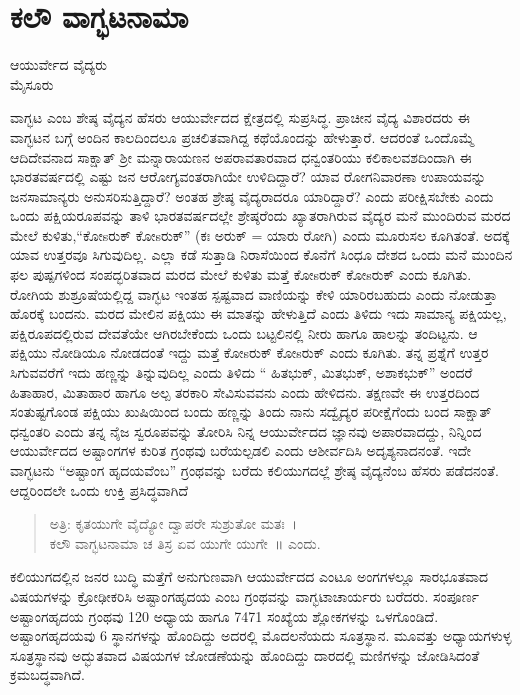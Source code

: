 {\fontsize{14}{16}\selectfont
\chapter{ಕಲೌ ವಾಗ್ಭಟನಾಮಾ} 

\begin{center}
\smallskip

ಆಯುರ್ವೇದ ವೈದ್ಯರು\\
ಮೈಸೂರು
\addrule
\end{center}

ವಾಗ್ಭಟ ಎಂಬ ಶೇಷ್ಠ ವೈದ್ಯನ ಹೆಸರು ಆಯುರ್ವೇದದ ಕ್ಷೇತ್ರದಲ್ಲಿ ಸುಪ್ರಸಿದ್ಧ. ಪ್ರಾಚೀನ ವೈದ್ಯ ವಿಶಾರದರು ಈ ವಾಗ್ಭಟನ ಬಗ್ಗೆ ಅಂದಿನ ಕಾಲದಿಂದಲೂ ಪ್ರಚಲಿತವಾಗಿದ್ದ ಕಥೆಯೊಂದನ್ನು ಹೇಳುತ್ತಾರೆ. ಆದರಂತೆ ಒಂದೊಮ್ಮೆ ಆದಿದೇವನಾದ  ಸಾಕ್ಷಾತ್ ಶ್ರೀ ಮನ್ನಾರಾಯಣನ ಅಪರಾವತಾರವಾದ ಧನ್ವಂತರಿಯು ಕಲಿಕಾಲವಶದಿಂದಾಗಿ ಈ ಭಾರತವರ್ಷದಲ್ಲಿ ಎಷ್ಟು ಜನ ಆರೋಗ್ಯವಂತರಾಗಿಯೇ ಉಳಿದಿದ್ದಾರೆ? ಯಾವ ರೋಗನಿವಾರಣಾ ಉಪಾಯವನ್ನು ಜನಸಾಮಾನ್ಯರು ಅನುಸರಿಸುತ್ತಿದ್ದಾರೆ? ಅಂತಹ ಶ್ರೇಷ್ಠ ವೈದ್ಯರಾದರೂ ಯಾರಿದ್ದಾರೆ? ಎಂದು ಪರೀಕ್ಷಿಸಬೇಕು ಎಂದು ಒಂದು ಪಕ್ಷಿಯರೂಪವನ್ನು ತಾಳಿ ಭಾರತವರ್ಷದಲ್ಲೇ ಶ್ರೇಷ್ಠರೆಂದು ಖ್ಯಾತರಾಗಿರುವ ವೈದ್ಯರ ಮನೆ ಮುಂದಿರುವ ಮರದ ಮೇಲೆ ಕುಳಿತು,“ಕೋsರುಕ್ ಕೋsರುಕ್” (ಕಃ ಅರುಕ್ = ಯಾರು ರೋಗಿ) ಎಂದು ಮೂರುಸಲ ಕೂಗಿತಂತೆ. ಅದಕ್ಕೆ ಯಾವ ಉತ್ತರವೂ ಸಿಗುವುದಿಲ್ಲ. ಎಲ್ಲಾ ಕಡೆ ಸುತ್ತಾಡಿ ನಿರಾಸೆಯಿಂದ ಕೊನೆಗೆ ಸಿಂಧೂ ದೇಶದ ಒಂದು ಮನೆ ಮುಂದಿನ ಫಲ ಪುಷ್ಪಗಳಿಂದ ಸಂಪದ್ಭರಿತವಾದ ಮರದ ಮೇಲೆ ಕುಳಿತು ಮತ್ತೆ ಕೋsರುಕ್ ಕೋsರುಕ್ ಎಂದು ಕೂಗಿತು. ರೋಗಿಯ ಶುಶ್ರೂಷೆಯಲ್ಲಿದ್ದ ವಾಗ್ಭಟ ಇಂತಹ ಸ್ಪಷ್ಟವಾದ ವಾಣಿಯನ್ನು ಕೇಳಿ ಯಾರಿರಬಹುದು ಎಂದು ನೋಡುತ್ತಾ ಹೊರಕ್ಕೆ ಬಂದನು. ಮರದ ಮೇಲಿನ ಪಕ್ಷಿಯು ಈ ಮಾತನ್ನು ಹೇಳುತ್ತಿದೆ ಎಂದು ತಿಳಿದು ಇದು ಸಾಮಾನ್ಯ ಪಕ್ಷಿಯಲ್ಲ, ಪಕ್ಷಿರೂಪದಲ್ಲಿರುವ ದೇವತೆಯೇ ಆಗಿರಬೇಕೆಂದು ಒಂದು ಬಟ್ಟಲಿನಲ್ಲಿ ನೀರು ಹಾಗೂ ಹಾಲನ್ನು ತಂದಿಟ್ಟನು. ಆ ಪಕ್ಷಿಯು ನೋಡಿಯೂ ನೋಡದಂತೆ ಇದ್ದು ಮತ್ತೆ ಕೋsರುಕ್ ಕೋsರುಕ್ ಎಂದು ಕೂಗಿತು. ತನ್ನ ಪ್ರಶ್ನೆಗೆ ಉತ್ತರ ಸಿಗುವವರೆಗೆ ಇದು ಹಣ್ಣನ್ನು ತಿನ್ನುವುದಿಲ್ಲ ಎಂದು ತಿಳಿದು “ ಹಿತಭುಕ್, ಮಿತಭುಕ್, ಅಶಾಕಭುಕ್” ಅಂದರೆ ಹಿತಾಹಾರ, ಮಿತಾಹಾರ ಹಾಗೂ ಅಲ್ಪ ತರಕಾರಿ ಸೇವಿಸುವವನು ಎಂದು ಹೇಳಿದನು. ತಕ್ಷಣವೇ ಈ ಉತ್ತರದಿಂದ ಸಂತುಷ್ಟಗೊಂಡ ಪಕ್ಷಿಯು ಖುಷಿಯಿಂದ ಬಂದು ಹಣ್ಣನ್ನು ತಿಂದು ನಾನು ಸದ್ವೈದ್ಯರ ಪರೀಕ್ಷೆಗೆಂದು ಬಂದ ಸಾಕ್ಷಾತ್ ಧನ್ವಂತರಿ ಎಂದು ತನ್ನ ನೈಜ ಸ್ವರೂಪವನ್ನು ತೋರಿಸಿ ನಿನ್ನ ಆಯುರ್ವೇದದ ಜ್ಞಾನವು ಅಪಾರವಾದದ್ದು, ನಿನ್ನಿಂದ ಆಯುರ್ವೇದದ ಅಷ್ಟಾಂಗಗಳ ಕುರಿತ ಗ್ರಂಥವು ಬರೆಯಲ್ಪಡಲಿ ಎಂದು ಆಶೀರ್ವದಿಸಿ ಅದೃಶ್ಯನಾದನಂತೆ. ಇದೇ ವಾಗ್ಭಟನು “ಅಷ್ಟಾಂಗ ಹೃದಯವೆಂಬ” ಗ್ರಂಥವನ್ನು ಬರೆದು ಕಲಿಯುಗದಲ್ಲೆ ಶ್ರೇಷ್ಠ ವೈದ್ಯನೆಂಬ ಹೆಸರು ಪಡೆದನಂತೆ. ಆದ್ದರಿಂದಲೇ ಒಂದು ಉಕ್ತಿ ಪ್ರಸಿದ್ಧವಾಗಿದೆ 
\begin{verse}
ಅತ್ರಿ: ಕೃತಯುಗೇ ವೈದ್ಯೋ ದ್ವಾಪರೇ ಸುಶ್ರುತೋ ಮತಃ~। \\
ಕಲೌ ವಾಗ್ಭಟನಾಮಾ ಚ ತಿಸ್ರ ಏವ ಯುಗೇ ಯುಗೇ~॥ ಎಂದು.
\end{verse}
ಕಲಿಯುಗದಲ್ಲಿನ ಜನರ ಬುದ್ಧಿ ಮತ್ತೆಗೆ ಅನುಗುಣವಾಗಿ ಆಯುರ್ವೇದದ ಎಂಟೂ ಅಂಗಗಳಲ್ಲೂ ಸಾರಭೂತವಾದ ವಿಷಯಗಳನ್ನು ಕ್ರೋಢೀಕರಿಸಿ ಅಷ್ಟಾಂಗಹೃದಯ ಎಂಬ ಗ್ರಂಥವನ್ನು ವಾಗ್ಭಟಾಚಾರ್ಯರು ಬರೆದರು. ಸಂಪೂರ್ಣ ಅಷ್ಟಾಂಗಹೃದಯ ಗ್ರಂಥವು 120 ಅಧ್ಯಾಯ ಹಾಗೂ 7471 ಸಂಖ್ಯೆಯ ಶ್ಲೋಕಗಳನ್ನು ಒಳಗೊಂಡಿದೆ. ಅಷ್ಟಾಂಗಹೃದಯವು 6 ಸ್ಥಾನಗಳನ್ನು ಹೊಂದಿದ್ದು ಅದರಲ್ಲಿ ಮೊದಲನೆಯದು ಸೂತ್ರಸ್ಥಾನ. ಮೂವತ್ತು ಅಧ್ಯಾಯಗಳುಳ್ಳ ಸೂತ್ರಸ್ಥಾನವು ಅದ್ಭುತವಾದ ವಿಷಯಗಳ ಜೋಡಣೆಯನ್ನು ಹೊಂದಿದ್ದು ದಾರದಲ್ಲಿ ಮಣಿಗಳನ್ನು ಜೋಡಿಸಿದಂತೆ ಕ್ರಮಬದ್ಧವಾಗಿದೆ.

}
